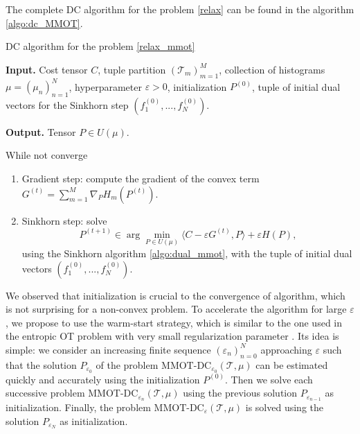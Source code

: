 \documentclass{article}
\begin{document}
The complete DC algorithm for the problem \ref{relax} can be found in the algorithm \ref{algo:dc_MMOT}.
\begin{algorithm}[!t]
  \caption{DC algorithm for the problem \ref{relax_mmot}}
  \textbf{Input.} Cost tensor $C$, tuple partition $(\mathcal T_m)_{m=1}^M$, collection of histograms $\mu = (\mu_n)_{n=1}^N$, 
  hyperparameter $\varepsilon > 0$, initialization $P^{(0)}$, tuple of initial dual vectors for the 
  Sinkhorn step $(f_1^{(0)},...,f_N^{(0)})$.

  \textbf{Output.} Tensor $P \in U(\mu)$.

  While not converge
  \begin{enumerate}
    \item Gradient step: compute the gradient of the convex term $G^{(t)} = \sum\limits_{m=1}^M \nabla_P H_m(P^{(t)})$.
    \item Sinkhorn step: solve 
    \begin{equation*}
      P^{(t+1)} \in \arg\min_{P \in U(\mu)} \langle C - \varepsilon G^{(t)}, P \rangle + \varepsilon H(P),
    \end{equation*}
    using the Sinkhorn algorithm \ref{algo:dual_mmot}, with the tuple of initial dual vectors $(f_1^{(0)},...,f_N^{(0)})$.
  \end{enumerate}
  \label{algo:dc_MMOT}
\end{algorithm}
We observed that initialization is crucial to the convergence of algorithm, which
is not surprising for a non-convex problem. To accelerate the algorithm for large $\varepsilon$, 
we propose to use the warm-start strategy, which is similar to the one used in the entropic OT problem with very 
small regularization parameter \citep{Schmitzer19}. Its idea is simple: we consider an increasing finite sequence 
$(\varepsilon_n)_{n=0}^N$ approaching $\varepsilon$ such that the solution $P_{\varepsilon_0}$ of the problem 
$\text{MMOT-DC}_{\varepsilon_0}(\mathcal T, \mu)$ can be estimated quickly and accurately using the initialization $P^{(0)}$. Then we solve each 
successive problem $\text{MMOT-DC}_{\varepsilon_n}(\mathcal T, \mu)$ using the previous solution $P_{\varepsilon_{n-1}}$ as initialization. Finally, 
the problem $\text{MMOT-DC}_{\varepsilon}(\mathcal T, \mu)$ is solved using the solution $P_{\varepsilon_N}$ as initialization.
\end{document}
